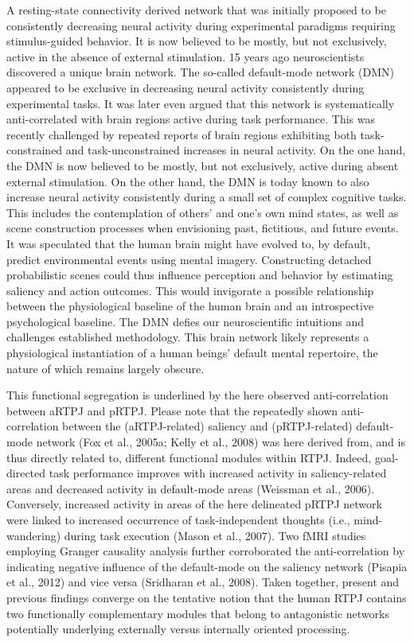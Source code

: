 \documentclass[authoryear,review,3p]{elsarticle}
\begin{document}
A resting-state connectivity derived network that was initially proposed to be consistently decreasing neural activity during experimental paradigms requiring stimulus-guided behavior. It is now believed to be mostly, but not exclusively, active in the absence of external stimulation. 
15 years ago neuroscientists discovered a unique brain network. The so-called default-mode network (DMN) appeared to be exclusive in decreasing neural activity consistently during experimental tasks.
It was later even argued that this network is systematically anti-correlated with brain regions active during task performance. This was recently challenged by repeated reports of brain regions exhibiting both task-constrained and task-unconstrained increases in neural activity. On the one hand, the DMN is now believed to be mostly, but not exclusively, active during absent external stimulation. On the other hand, the DMN is today known to also increase neural activity consistently during a small set of complex cognitive tasks. This includes the contemplation of others’ and one’s own mind states, as well as scene construction processes when envisioning past, fictitious, and future events. It was speculated that the human brain might have evolved to, by default, predict environmental events using mental imagery. Constructing detached probabilistic scenes could thus influence perception and behavior by estimating saliency and action outcomes. This would invigorate a possible relationship between the physiological baseline of the human brain and an introspective psychological baseline.
The DMN defies our neuroscientific intuitions and challenges established methodology. This brain network likely represents a physiological instantiation of a human beings' default mental repertoire, the nature of which remains largely obscure.

This functional segregation is underlined by the here observed anti-correlation between aRTPJ and pRTPJ. Please note that the repeatedly shown anti-correlation between the (aRTPJ-related) saliency and (pRTPJ-related) default-mode network (Fox et al., 2005a; Kelly et al., 2008) was here derived from, and is thus directly related to, different functional modules within RTPJ. Indeed, goal-directed task performance improves with increased activity in saliency-related areas and decreased activity in default-mode areas (Weissman et al., 2006). Conversely, increased activity in areas of the here delineated pRTPJ network were linked to increased occurrence of task-independent thoughts (i.e., mind-wandering) during task execution (Mason et al., 2007). Two fMRI studies employing Granger causality analysis further corroborated the anti-correlation by indicating negative influence of the default-mode on the saliency network (Pisapia et al., 2012) and vice versa (Sridharan et al., 2008). Taken together, present and previous findings converge on the tentative notion that the human RTPJ contains two functionally complementary modules that belong to antagonistic networks potentially underlying externally versus internally oriented processing.
\end{document}
